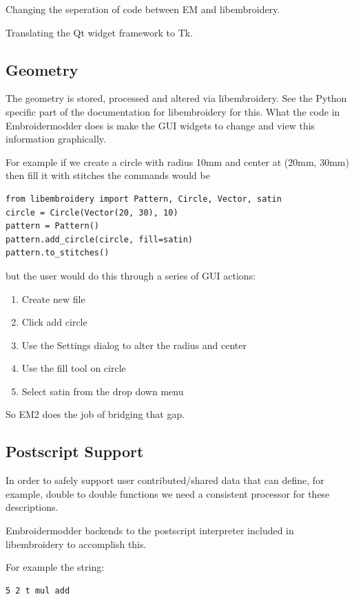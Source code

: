 \documentclass{report}
\begin{document}
Changing the seperation of code between EM and libembroidery.

Translating the Qt widget framework to Tk.

\subsection{Geometry}

The geometry is stored, processed and altered via libembroidery. See the Python specific part of the documentation for libembroidery for this. What the code in Embroidermodder does is make the GUI widgets to change and view this information graphically.

For example if we create a circle with radius 10mm and center at (20mm, 30mm) then fill it with stitches the commands would be

\begin{lstlisting}
from libembroidery import Pattern, Circle, Vector, satin
circle = Circle(Vector(20, 30), 10)
pattern = Pattern()
pattern.add_circle(circle, fill=satin)
pattern.to_stitches()
\end{lstlisting}

but the user would do this through a series of GUI actions:

\begin{enumerate}
\item Create new file
\item Click add circle
\item Use the Settings dialog to alter the radius and center
\item Use the fill tool on circle
\item Select satin from the drop down menu
\end{enumerate}

So EM2 does the job of bridging that gap.


\subsection{Postscript Support}

In order to safely support user contributed/shared data that can
define, for example, double to double functions we need a consistent
processor for these descriptions.

Embroidermodder backends to the postscript interpreter included
in libembroidery to accomplish this.

For example the string:

\begin{verbatim}
5 2 t mul add
\end{verbatim}
\end{document}

